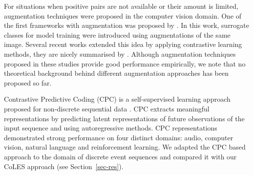 \documentclass[sigconf]{acmart}
\begin{document}
For situations when positive pairs are not available or their amount is limited, augmentation techniques were proposed in the computer vision domain. One of the first frameworks with augmentation  was proposed by \cite{Dosovitskiy2014DiscriminativeUF}. In this work, surrogate classes for model training were introduced using augmentations of the same image. Several recent works \citep{Bachman2019LearningRB, He2019MomentumCF, Chen2020ASF} extended this idea by applying contrastive learning methods, they are nicely summarised by \cite{Falcon2020AFF}. Although augmentation techniques proposed in these studies provide good performance empirically, we note that no theoretical background behind different augmentation approaches has been proposed so far.

Contrastive Predictive Coding (CPC) is a self-supervised learning approach proposed for non-discrete sequential data \citep{Oord2018RepresentationLW}. CPC extracts meaningful representations by predicting latent representations of future observations of the input sequence and using autoregressive methods. CPC representations demonstrated strong performance on four distinct domains: audio, computer vision, natural language and reinforcement learning. We adapted the CPC based approach to the domain of discrete event sequences and compared it with our CoLES approach (see Section~\ref{sec-res}).



\end{document}
